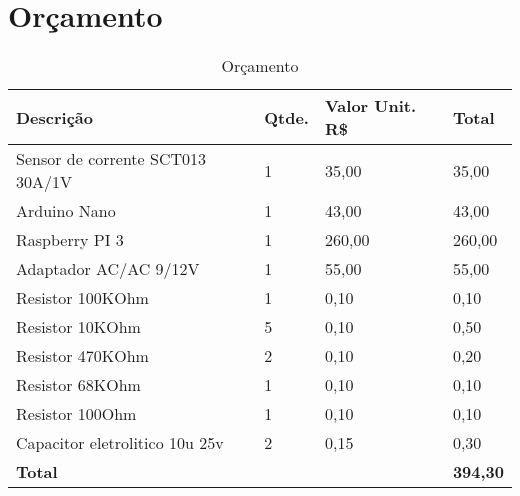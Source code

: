 \chapter{Orçamento}

\begin{table}[htb]
\captionsetup{justification=centering}
\caption{Orçamento}
\label{tbOrc}
\begin{tabular}{p{7cm}|p{1cm}|p{3cm}|p{3cm}}
    \hline
    \textbf{Descrição} & \textbf{Qtde.} & \textbf{Valor Unit. R\$} & \textbf{Total} \\
    \hline
    Sensor de corrente SCT013 30A/1V & 1 & 35,00 & 35,00 \\
    \hline
    Arduino Nano & 1 & 43,00 & 43,00 \\
    \hline
    Raspberry PI 3 & 1 & 260,00 & 260,00 \\
    \hline
    Adaptador AC/AC 9/12V & 1 & 55,00 & 55,00 \\
    \hline
    Resistor 100KOhm & 1 & 0,10 & 0,10 \\
    \hline
    Resistor 10KOhm & 5 & 0,10 & 0,50 \\
    \hline
    Resistor 470KOhm & 2 & 0,10 & 0,20 \\
    \hline
    Resistor 68KOhm & 1 & 0,10 & 0,10 \\
    \hline
    Resistor 100Ohm & 1 & 0,10 & 0,10 \\
    \hline
    Capacitor eletrolitico 10u 25v & 2 & 0,15 & 0,30 \\
    \hline
    \textbf{Total} & & & \textbf{394,30} \\
    \hline
\end{tabular}
\end{table}